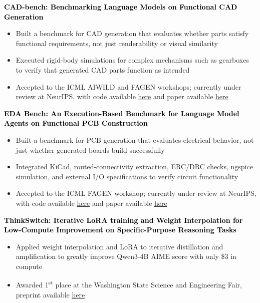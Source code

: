 \documentclass[8pt,a4paper]{altacv}
\newcommand{\resumebodysize}{\fontsize{8pt}{9pt}\selectfont}
\renewcommand{\divider}{\textcolor{body!30}{\hdashrule{\linewidth}{0.6pt}{0.285em}}\vspace{4.096pt}}
\newcommand{\projectdivider}{\vskip-1.937pt\divider}
\renewcommand{\cvevent}[4]{%
  {\fontsize{9pt}{9pt}\selectfont\color{black}\hspace*{-0.282pt}#1\par}
  \ifstrequal{#2}{}{}{%
    \vspace{2.144pt}
    {\fontsize{9pt}{9pt}\selectfont\textbf{\color{accent}#2}\hspace{0.5em}\resumebodysize\faCalendar\hspace{0.5em}#3\par}%
  }%
  \vspace{2.145pt}\resumebodysize
}
\begin{document}
\cvevent{\textcolor{black}{\textbf{CAD-bench: Benchmarking Language Models on Functional CAD Generation}}}{}{}{}
\begin{itemize}
\item Built a benchmark for CAD generation that evaluates whether parts satisfy functional requirements, not just renderability or visual similarity
\item Executed rigid-body simulations for complex mechanisms such as gearboxes to verify that generated CAD parts function as intended
\item Accepted to the ICML AIWILD and FAGEN workshops; currently under review at NeurIPS, with code available \href{https://github.com/cad-bench/cad-bench}{here} and paper available \href{https://github.com/CAD-bench/cad-bench/blob/main/paper/main.pdf}{here}
\end{itemize}
\projectdivider

\cvevent{\textcolor{black}{\textbf{EDA Bench: An Execution-Based Benchmark for Language Model Agents on Functional PCB Construction}}}{}{}{}
\begin{itemize}
\item Built a benchmark for PCB generation that evaluates electrical behavior, not just whether generated boards build successfully
\item Integrated KiCad, routed-connectivity extraction, ERC/DRC checks, ngspice simulation, and external I/O specifications to verify circuit functionality
\item Accepted to the ICML FAGEN workshop; currently under review at NeurIPS, with code available \href{https://github.com/eda-bench/eda-bench}{here} and paper available \href{https://github.com/eda-bench/eda-bench/blob/master/paper/main.pdf}{here}
\end{itemize}
\projectdivider

\cvevent{\textcolor{black}{\textbf{ThinkSwitch: Iterative LoRA training and Weight Interpolation for Low-Compute Improvement on Specific-Purpose Reasoning Tasks}}}{}{}{}
\begin{itemize}
\item Applied weight interpolation and LoRA to iterative distillation and amplification to greatly improve Qwen3-4B AIME score with only \$3 in compute
\item Awarded 1\textsuperscript{st} place at the Washington State Science and Engineering Fair, preprint available \href{https://arxiv.org/abs/2606.01080}{here}
\end{itemize}
\divider
\end{document}
